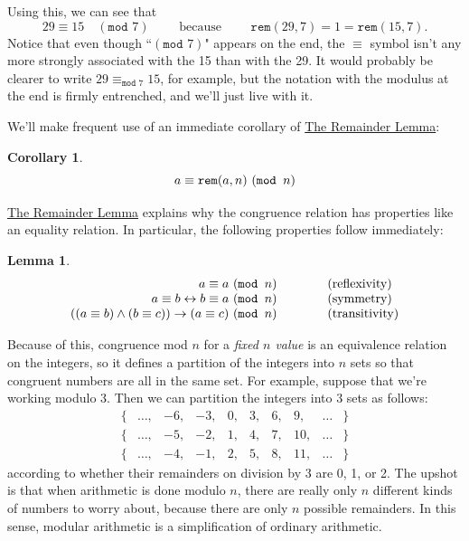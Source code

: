 \documentclass[11pt,oneside]{book}
\newtheorem{coro}[thm]{Corollary}
\newtheorem{lem}[thm]{Lemma}
\theoremstyle{definition}
\begin{document}
Using this, we can see that
\[ 29 \equiv 15\quad (\texttt{mod } 7) \qquad \text{ because } \qquad \texttt{rem}(29, 7) = 1 = \texttt{rem}(15, 7). \]
Notice that even though ``$(\texttt{mod } 7)$" appears on the end, the $\equiv$ symbol isn't any more strongly associated with the 15 than with the 29.
It would probably be clearer to write $29 \equiv_{\texttt{mod } 7} 15$, for example, but the notation with the modulus at the end is firmly entrenched, and we'll just live with it.

We'll make frequent use of an immediate corollary of \hyperref[lem:Remainder]{The Remainder Lemma}:

\begin{coro} \label{coro:SelfCongruence}
    \[ a \equiv \textnormal{\texttt{rem}}(a, n)\ (\textnormal{\texttt{mod }} n) \]
\end{coro}

\hyperref[lem:Remainder]{The Remainder Lemma} explains why the congruence relation has properties like an equality relation.
In particular, the following properties follow immediately:
\begin{lem}\ \label{lem:CongruenceEquivalence}
\[\begin{array}{rcl}
    a \equiv a\ (\textnormal{\texttt{mod }} n) & \qquad & \textnormal{(reflexivity)} \\
    a \equiv b \leftrightarrow b \equiv a\ (\textnormal{\texttt{mod }} n) && \textnormal{(symmetry)} \\
    ((a \equiv b) \land (b \equiv c)) \rightarrow (a \equiv c)\ (\textnormal{\texttt{mod }} n) && \textnormal{(transitivity)}
\end{array}\]
\end{lem}
Because of this, congruence mod $n$ for a \emph{fixed $n$ value} is an equivalence relation on the integers, so it defines a partition of the integers into $n$ sets so that congruent numbers are all in the same set.
For example, suppose that we're working modulo 3.
Then we can partition the integers into 3 sets as follows:
\[\begin{array}{cccccccccc}
    \{ & \dots, & -6, & -3, & 0, & 3, & 6, & 9, & \dots & \} \\
    \{ & \dots, & -5, & -2, & 1, & 4, & 7, & 10, & \dots & \} \\
    \{ & \dots, & -4, & -1, & 2, & 5, & 8, & 11, & \dots & \}
\end{array}\]
according to whether their remainders on division by 3 are 0, 1, or 2.
The upshot is that when arithmetic is done modulo $n$, there are really only $n$ different kinds of numbers to worry about, because there are only $n$ possible remainders.
In this sense, modular arithmetic is a simplification of ordinary arithmetic.
\end{document}
